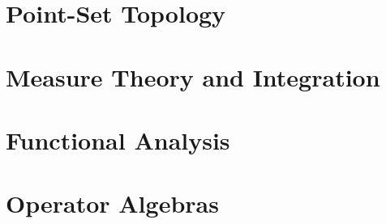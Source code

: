 \documentclass[11pt]{package2}
\begin{document}
\chapter{Point-Set Topology}\label{ch:point_set_topology}

\chapter{Measure Theory and Integration}\label{ch:measure_theory}

\chapter{Functional Analysis}\label{ch:functional_analysis}

\chapter{Operator Algebras}\label{ch:operator_algebras}

\nocite{*}
\printbibliography[heading=bibintoc,title={References}]
\end{document}
